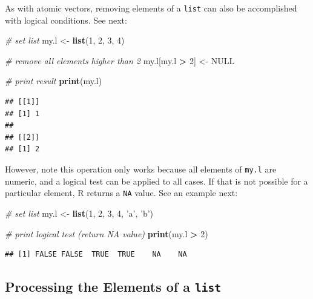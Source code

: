\documentclass[11pt,]{book}
\newenvironment{Shaded}{\begin{snugshade}}{\end{snugshade}}
\newcommand{\KeywordTok}[1]{\textcolor[rgb]{0.27,0.27,0.27}{\textbf{#1}}}
\newcommand{\DecValTok}[1]{\textcolor[rgb]{0.06,0.06,0.06}{#1}}
\newcommand{\StringTok}[1]{\textcolor[rgb]{0.5,0.5,0.5}{#1}}
\newcommand{\CommentTok}[1]{\textcolor[rgb]{0.56,0.35,0.01}{\textit{#1}}}
\newcommand{\OtherTok}[1]{\textcolor[rgb]{0.56,0.35,0.01}{#1}}
\newcommand{\OperatorTok}[1]{\textcolor[rgb]{0.81,0.36,0.00}{\textbf{#1}}}
\newcommand{\NormalTok}[1]{#1}
\begin{document}
As with atomic vectors, removing elements of a \texttt{list} can also be
accomplished with logical conditions. See next:

\begin{Shaded}
\begin{Highlighting}[]
\CommentTok{# set list}
\NormalTok{my.l <-}\StringTok{ }\KeywordTok{list}\NormalTok{(}\DecValTok{1}\NormalTok{, }\DecValTok{2}\NormalTok{, }\DecValTok{3}\NormalTok{, }\DecValTok{4}\NormalTok{)}

\CommentTok{# remove all elements higher than 2}
\NormalTok{my.l[my.l }\OperatorTok{>}\StringTok{ }\DecValTok{2}\NormalTok{] <-}\StringTok{ }\OtherTok{NULL}

\CommentTok{# print result}
\KeywordTok{print}\NormalTok{(my.l)}
\end{Highlighting}
\end{Shaded}

\begin{verbatim}
## [[1]]
## [1] 1
## 
## [[2]]
## [1] 2
\end{verbatim}

However, note this operation only works because all elements of
\texttt{my.l} are numeric, and a logical test can be applied to all
cases. If that is not possible for a particular element, R returns a
\texttt{NA} value. See an example next:

\begin{Shaded}
\begin{Highlighting}[]
\CommentTok{# set list}
\NormalTok{my.l <-}\StringTok{ }\KeywordTok{list}\NormalTok{(}\DecValTok{1}\NormalTok{, }\DecValTok{2}\NormalTok{, }\DecValTok{3}\NormalTok{, }\DecValTok{4}\NormalTok{, }\StringTok{'a'}\NormalTok{, }\StringTok{'b'}\NormalTok{)}

\CommentTok{# print logical test (return NA value)}
\KeywordTok{print}\NormalTok{(my.l }\OperatorTok{>}\StringTok{ }\DecValTok{2}\NormalTok{)}
\end{Highlighting}
\end{Shaded}

\begin{verbatim}
## [1] FALSE FALSE  TRUE  TRUE    NA    NA
\end{verbatim}

\subsection{\texorpdfstring{Processing the Elements of a
\texttt{list}}{Processing the Elements of a list}}\label{processing-the-elements-of-a-list}
\end{document}
